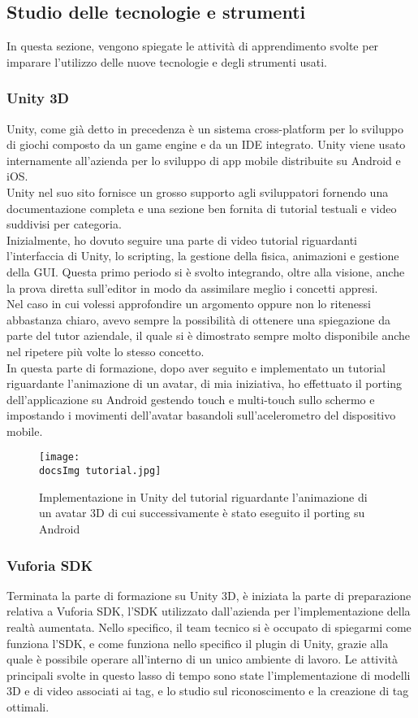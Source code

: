 \subsection{Studio delle tecnologie e strumenti}
In questa sezione, vengono spiegate le attivit\`a di apprendimento svolte per imparare l'utilizzo delle nuove tecnologie e degli strumenti usati.
\subsubsection{Unity 3D}
Unity, come gi\`a detto in precedenza \`e un sistema cross-platform per lo sviluppo di giochi composto da un game engine e da un IDE integrato. Unity viene usato internamente all'azienda per lo sviluppo di app mobile distribuite su Android e iOS.
\\
Unity nel suo sito fornisce un grosso supporto agli sviluppatori fornendo una documentazione completa e una sezione ben fornita di tutorial testuali e video suddivisi per categoria.\\
Inizialmente, ho dovuto seguire una parte di video tutorial riguardanti l'interfaccia di Unity, lo scripting, la gestione della fisica, animazioni e gestione della GUI. Questa primo periodo si \`e svolto integrando, oltre alla visione, anche la prova diretta sull'editor in modo da assimilare meglio i concetti appresi.\\
Nel caso in cui volessi approfondire un argomento oppure non lo ritenessi abbastanza chiaro, avevo sempre la possibilit\`a di ottenere una spiegazione da parte del tutor aziendale, il quale si \`e dimostrato sempre molto disponibile anche nel ripetere pi\`u volte lo stesso concetto.\\
In questa parte di formazione, dopo aver seguito e implementato un tutorial riguardante l'animazione di un avatar, di mia iniziativa, ho effettuato il porting dell'applicazione su Android gestendo touch e multi-touch sullo schermo e impostando i movimenti dell'avatar basandoli sull'acelerometro del dispositivo mobile.

\begin{figure}[H]
	\centering
	\texttt{[image: \\docsImg tutorial.jpg]}
	\caption{Implementazione in Unity del tutorial riguardante l'animazione di un avatar 3D di cui successivamente \`e stato eseguito il porting su Android}
	\label{fig:tutorial riguardante l'animazione di un avatar 3D}
\end{figure}
 
\subsubsection{Vuforia SDK}
Terminata la parte di formazione su Unity 3D, \`e iniziata la parte di preparazione relativa a Vuforia SDK, l'SDK utilizzato dall'azienda per l'implementazione della realt\`a aumentata. Nello specifico, il team tecnico si \`e occupato di spiegarmi come funziona l'SDK, e come funziona nello specifico il plugin di Unity, grazie alla quale è possibile operare all’interno di un unico ambiente di lavoro. Le attivit\`a principali svolte in questo lasso di tempo sono state l'implementazione di modelli 3D e di video associati ai tag, e lo studio sul riconoscimento e la creazione di tag ottimali.

